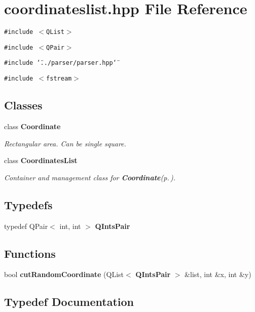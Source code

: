 \section{coordinateslist.hpp File Reference}
\label{coordinateslist_8hpp}
{\tt \#include $<$QList$>$}\par
{\tt \#include $<$QPair$>$}\par
{\tt \#include \char`\"{}../parser/parser.hpp\char`\"{}}\par
{\tt \#include $<$fstream$>$}\par
\subsection*{Classes}
\begin{CompactItemize}
\item 
class {\bf Coordinate}
\begin{CompactList}\small\item\em Rectangular area. Can be single square. \item\end{CompactList}\item 
class {\bf Coordinates\-List}
\begin{CompactList}\small\item\em Container and management class for {\bf Coordinate}{\rm (p.\,\pageref{classCoordinate})}. \item\end{CompactList}\end{CompactItemize}
\subsection*{Typedefs}
\begin{CompactItemize}
\item 
typedef QPair$<$ int, int $>$ {\bf QInts\-Pair}
\end{CompactItemize}
\subsection*{Functions}
\begin{CompactItemize}
\item 
bool {\bf cut\-Random\-Coordinate} (QList$<$ {\bf QInts\-Pair} $>$ \&list, int \&x, int \&y)
\end{CompactItemize}


\subsection{Typedef Documentation}
